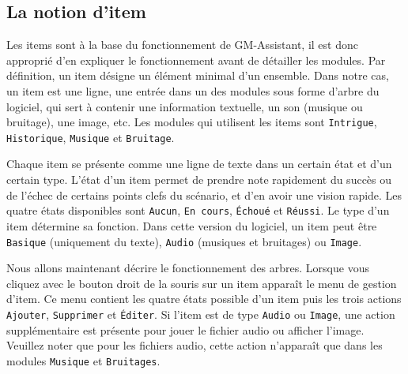 \documentclass[a4paper,12pt]{article}
\newcommand*{\GMA}{GM-Assistant\xspace}
\newcommand*{\interfaceitem}[1]{\texttt{#1}}
\begin{document}
\subsection{La notion d'item}
\label{item}

Les items sont à la base du fonctionnement de \GMA, il est donc approprié d'en expliquer le fonctionnement avant de détailler les modules.
Par définition, un item désigne un élément minimal d'un ensemble.
Dans notre cas, un item est une ligne, une entrée dans un des modules sous forme d'arbre du logiciel, qui sert à contenir une information textuelle, un son (musique ou bruitage), une image, etc.
Les modules qui utilisent les items sont \interfaceitem{Intrigue}, \interfaceitem{Historique}, \interfaceitem{Musique} et \interfaceitem{Bruitage}.

Chaque item se présente comme une ligne de texte dans un certain état et d'un certain type.
L'état d'un item permet de prendre note rapidement du succès ou de l'échec de certains points clefs du scénario, et d'en avoir une vision rapide.
Les quatre états disponibles sont \interfaceitem{Aucun}, \interfaceitem{En cours}, \interfaceitem{Échoué} et \interfaceitem{Réussi}.
Le type d'un item détermine sa fonction.
Dans cette version du logiciel, un item peut être \interfaceitem{Basique} (uniquement du texte), \interfaceitem{Audio} (musiques et bruitages) ou \interfaceitem{Image}.

Nous allons maintenant décrire le fonctionnement des arbres.
Lorsque vous cliquez avec le bouton droit de la souris sur un item apparaît le menu de gestion d'item.
Ce menu contient les quatre états possible d'un item puis les trois actions \interfaceitem{Ajouter}, \interfaceitem{Supprimer} et \interfaceitem{Éditer}.
Si l'item est de type \interfaceitem{Audio} ou \interfaceitem{Image}, une action supplémentaire est présente pour jouer le fichier audio ou afficher l'image.
Veuillez noter que pour les fichiers audio, cette action n'apparaît que dans les modules \interfaceitem{Musique} et \interfaceitem{Bruitages}.
\end{document}
